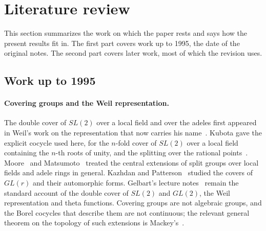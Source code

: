 \section*{Literature review}
\label{sec:literature}

This section summarizes the work on which the paper rests and says how the
present results fit in. The first part covers work up to 1995, the date
of the original notes. The second part covers later work, most of which
the revision uses.

\subsection*{Work up to 1995}

\paragraph{Covering groups and the Weil representation.} The double
cover of $SL(2)$ over a local field and over the adeles first appeared in
Weil's work on the representation that now carries his name~\cite{We64}.
Kubota gave the explicit cocycle used here, for the $n$-fold cover of
$SL(2)$ over a local field containing the $n$-th roots of unity, and the
splitting over the rational points~\cite{Ku67,Ku69}. Moore~\cite{Mo68} and
Matsumoto~\cite{Ma69} treated the central extensions of split groups
over local fields and adele rings in general. Kazhdan and
Patterson~\cite{KP84} studied the covers of $GL(r)$ and their automorphic
forms. Gelbart's lecture
notes~\cite{Ge76} remain the standard account of the double cover of
$SL(2)$ and $GL(2)$, the Weil representation and theta functions.
Covering groups are not algebraic groups, and the Borel cocycles that
describe them are not continuous; the relevant general theorem on the
topology of such extensions is Mackey's~\cite{Ma57}.

